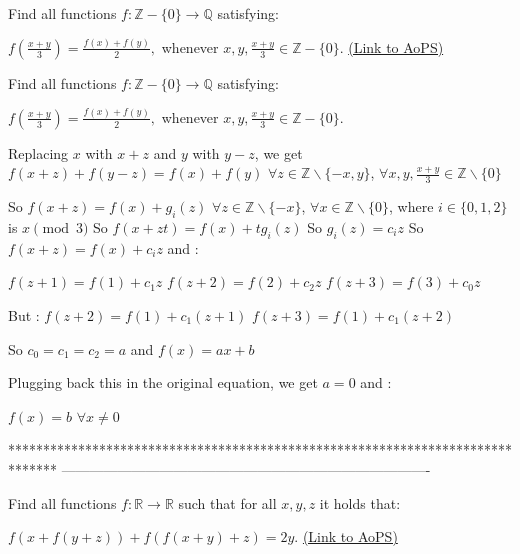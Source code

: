 \begin{problem}
	Find all functions $ f: \mathbb{Z} - \{ 0 \} \rightarrow \mathbb{Q}$ satisfying:

$ f \left( \frac{x+y}{3} \right)=\frac {f(x)+f(y)}{2},$ whenever $ x,y,\frac{x+y}{3} \in \mathbb{Z} - \{ 0 \}.$
	\flushright \href{https://artofproblemsolving.com/community/c6h288038}{(Link to AoPS)}
\end{problem}



\begin{solution}
	\begin{tcolorbox}Find all functions $ f: \mathbb{Z} - \{ 0 \} \rightarrow \mathbb{Q}$ satisfying:

$ f \left( \frac {x + y}{3} \right) = \frac {f(x) + f(y)}{2},$ whenever $ x,y,\frac {x + y}{3} \in \mathbb{Z} - \{ 0 \}.$\end{tcolorbox}

Replacing $ x$ with $ x+z$ and $ y$ with $ y-z$, we get $ f(x+z)+f(y-z)=f(x)+f(y)$ $ \forall z\in\mathbb Z\backslash\{-x,y\}$, $ \forall x,y,\frac{x+y}3\in\mathbb Z\backslash\{0\}$

So $ f(x+z)=f(x)+g_i(z)$ $ \forall z\in\mathbb Z\backslash\{-x\}$, $ \forall x\in\mathbb Z\backslash\{0\}$, where $ i\in\{0,1,2\}$ is $ x\pmod 3$
So $ f(x+zt)=f(x)+tg_i(z)$
So $ g_i(z)=c_iz$
So $ f(x+z)=f(x)+c_iz$ and :

$ f(z+1)=f(1)+c_1z$
$ f(z+2)=f(2)+c_2z$
$ f(z+3)=f(3)+c_0z$

But :
$ f(z+2)=f(1)+c_1(z+1)$
$ f(z+3)=f(1)+c_1(z+2)$

So $ c_0=c_1=c_2=a$ and $ f(x)=ax+b$

Plugging back this in the original equation, we get $ a=0$ and :

$ f(x)=b$ $ \forall x\neq 0$
\end{solution}
*******************************************************************************
-------------------------------------------------------------------------------

\begin{problem}
	Find all functions $ f: \mathbb{R} \rightarrow \mathbb{R}$ such that for all $ x,y,z$ it holds that:

$ f(x+f(y+z))+f(f(x+y)+z)=2y.$
	\flushright \href{https://artofproblemsolving.com/community/c6h288281}{(Link to AoPS)}
\end{problem}




